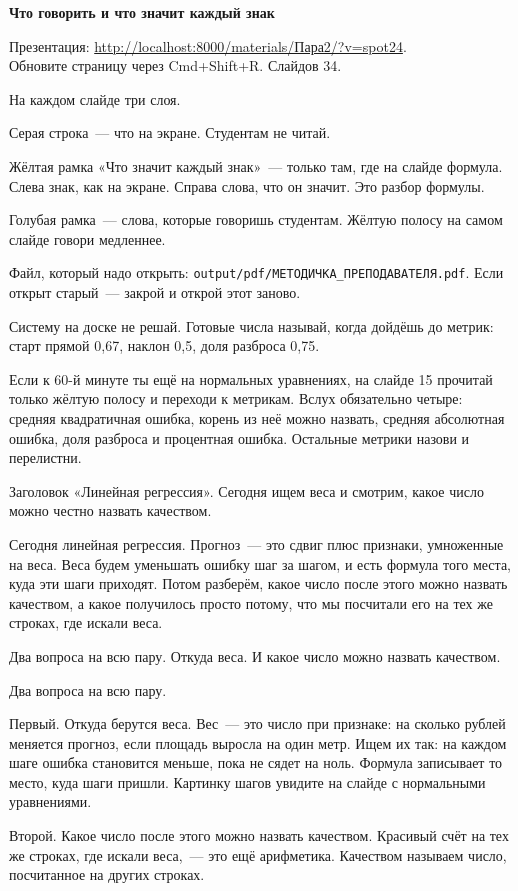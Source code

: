 \documentclass[11pt,a4paper]{article}
\newcommand{\slidehead}[2]{\par\vspace{4mm}{\color{navy}\large\bfseries Слайд #1. #2}\par\vspace{1mm}}
\newcommand{\screen}[1]{\par{\color{ink}\small #1\par}\vspace{1mm}}
\newcommand{\say}[1]{\begin{saybox}#1\end{saybox}}
\begin{document}
{\color{navy}\bfseries\fontsize{24}{30}\selectfont Что говорить и что значит каждый знак\par}
\vspace{2mm}
Презентация: \url{http://localhost:8000/materials/Пара2/?v=spot24}.\\
Обновите страницу через Cmd+Shift+R. Слайдов 34.

На каждом слайде три слоя.

Серая строка~--- что на экране. Студентам не читай.

Жёлтая рамка «Что значит каждый знак»~--- только там, где на слайде формула. Слева знак, как на экране. Справа слова, что он значит. Это разбор формулы.

Голубая рамка~--- слова, которые говоришь студентам. Жёлтую полосу на самом слайде говори медленнее.

Файл, который надо открыть: \texttt{output/pdf/МЕТОДИЧКА\_ПРЕПОДАВАТЕЛЯ.pdf}. Если открыт старый~--- закрой и открой этот заново.

Систему на доске не решай. Готовые числа называй, когда дойдёшь до метрик: старт прямой 0,67, наклон 0,5, доля разброса 0,75.

Если к 60-й минуте ты ещё на нормальных уравнениях, на слайде 15 прочитай только жёлтую полосу и переходи к метрикам. Вслух обязательно четыре: средняя квадратичная ошибка, корень из неё можно назвать, средняя абсолютная ошибка, доля разброса и процентная ошибка. Остальные метрики назови и перелистни.

\slidehead{1}{Титул}
\screen{Заголовок «Линейная регрессия». Сегодня ищем веса и смотрим, какое число можно честно назвать качеством.}
\say{Сегодня линейная регрессия. Прогноз~--- это сдвиг плюс признаки, умноженные на веса. Веса будем уменьшать ошибку шаг за шагом, и есть формула того места, куда эти шаги приходят. Потом разберём, какое число после этого можно назвать качеством, а какое получилось просто потому, что мы посчитали его на тех же строках, где искали веса.}

\slidehead{2}{Вопрос пары}
\screen{Два вопроса на всю пару. Откуда веса. И какое число можно назвать качеством.}
\say{Два вопроса на всю пару.

Первый. Откуда берутся веса. Вес~--- это число при признаке: на сколько рублей меняется прогноз, если площадь выросла на один метр. Ищем их так: на каждом шаге ошибка становится меньше, пока не сядет на ноль. Формула записывает то место, куда шаги пришли. Картинку шагов увидите на слайде с нормальными уравнениями.

Второй. Какое число после этого можно назвать качеством. Красивый счёт на тех же строках, где искали веса,~--- это ещё арифметика. Качеством называем число, посчитанное на других строках.}
\end{document}
